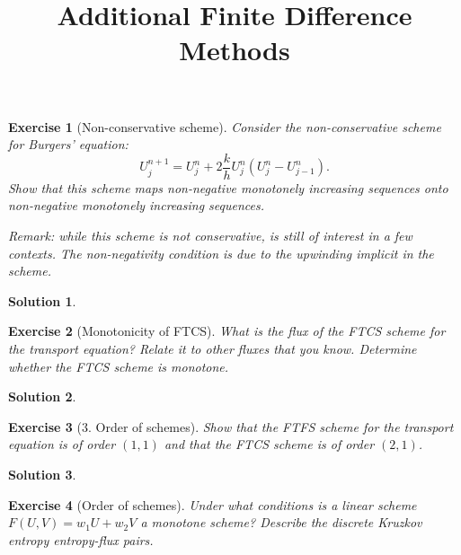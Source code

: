 \documentclass[10pt,letterpaper]{article}
\theoremstyle{break}
\newtheorem{exercise}{Exercise}
\newtheorem{solution}{Solution}
\begin{document}
\title{Additional Finite Difference Methods}
\date{}

\maketitle





\begin{exercise}[Non-conservative scheme]
	Consider the non-conservative scheme for Burgers' equation:
	\begin{equation}
		U^{n+1}_j = 	U^{n}_j +  	2 \frac{k}{h} U^{n}_j \left( 	U^{n}_j - U^{n}_{j-1} \right).
	\end{equation}
	Show that this scheme maps non-negative monotonely increasing sequences onto non-negative monotonely increasing sequences. 

	\textit{Remark: while this scheme is not conservative, is still of interest in a few contexts. The non-negativity condition is due to the upwinding implicit in the scheme.}
\end{exercise}

\begin{solution}

\end{solution}


\begin{exercise}[Monotonicity of FTCS]
	What is the flux of the FTCS scheme for the transport equation? Relate it to other fluxes that you know. Determine whether the FTCS scheme is monotone.
\end{exercise}

\begin{solution}

\end{solution}








\begin{exercise}[3. Order of schemes]
	Show that the FTFS scheme for the transport equation is of order $(1,1)$ and that the FTCS scheme is of order $(2,1)$.
\end{exercise}

\begin{solution}

\end{solution}





\begin{exercise}[Order of schemes]
	Under what conditions is a linear scheme $F(U,V) = w_1 U + w_2 V$ a monotone scheme?
	Describe the discrete Kruzkov entropy entropy-flux pairs.
\end{exercise}
\end{document}
